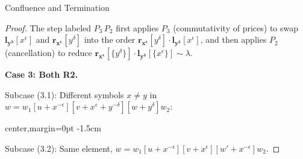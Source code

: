 \documentclass{article}
\theoremstyle{definition}
\theoremstyle{remark}
\theoremstyle{theorem}
\theoremstyle{definition}
\begin{document}
\begin{section}{Confluence and Termination}
\begin{proof}
The step labeled $P_3\,P_2$ first applies $P_3$ (commutativity of prices) to swap $\mathbf{l_{y^\delta}}[x^\epsilon]$ and $\mathbf{r_{x^\epsilon}}[y^\delta]$ into the order $\mathbf{r_{x^\epsilon}}[y^\delta]\cdot\mathbf{l_{y^\delta}}[x^\epsilon]$, and then applies $P_2$ (cancellation) to reduce $\mathbf{r_{x^\epsilon}}[\{y^\delta\}]\cdot\mathbf{l_{y^\delta}}[\{x^\epsilon\}]\sim\lambda$.

\textbf{Case 3: Both R2.}


Subcase (3.1): Different symbols $x \neq y$ in $w = w_1[u+x^{-\epsilon}][v+x^\epsilon+y^{-\delta}][w+y^\delta]w_2$:
\vspace{40pt}
\begin{center}
\begin{adjustbox}{center,margin=0pt -1.5cm}
\end{adjustbox}
\end{center}
\vspace{40pt}

Subcase (3.2): Same element, $w = w_1[u+x^{-\epsilon}][v+x^\epsilon][w'+x^{-\epsilon}]w_2$.


\end{proof}
\end{section}
\end{document}
